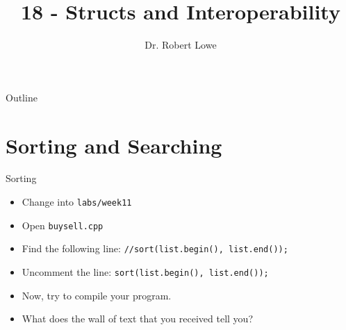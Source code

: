 \documentclass[]{beamer}
\title{18 - Structs and Interoperability}
\author{Dr. Robert Lowe\\}
\institute[Maryville College] %
{
  Division of Mathematics and Computer Science\\
  Maryville College
}
\date[]{}
\begin{document}
\begin{frame}
  \titlepage
\end{frame}

\begin{frame}{Outline}
  \tableofcontents
\end{frame}





\section{Sorting and Searching}
\begin{frame}[fragile]{Sorting}
    \begin{itemize}[<+->]
        \item Change into \texttt{labs/week11}
        \item Open \texttt{buysell.cpp}
        \item Find the following line:
            \newline\verb!//sort(list.begin(), list.end());!
        \item Uncomment the line:
            \newline\verb!sort(list.begin(), list.end());!
        \item Now, try to compile your program.
        \item What does the wall of text that you received tell you?
    \end{itemize}
\end{frame}
\end{document}
